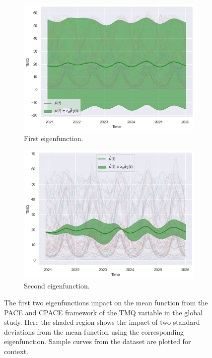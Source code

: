 \begin{figure}
	\centering
	\begin{subfigure}[b]{0.45\textwidth}
		\includegraphics[width=\textwidth]{phi_1_tmq_globe}
		\caption{First eigenfunction.}
		\label{fig:phi_1_tmq_globe}
	\end{subfigure}
	\hfill        
	\begin{subfigure}[b]{0.45\textwidth}
		\includegraphics[width=\textwidth]{phi_2_tmq_globe}
		\caption{Second eigenfunction.}
		\label{fig:phi_2_tmq_globe}
	\end{subfigure}
	\caption{The first two eigenfunctions impact on the mean function from the PACE and CPACE framework of the TMQ variable in the global study. Here the shaded region shows the impact of two standard deviations from the mean function using the corresponding eigenfunction. Sample curves from the dataset are plotted for context.}
	\label{fig:phi_tmq_globe}
\end{figure}

